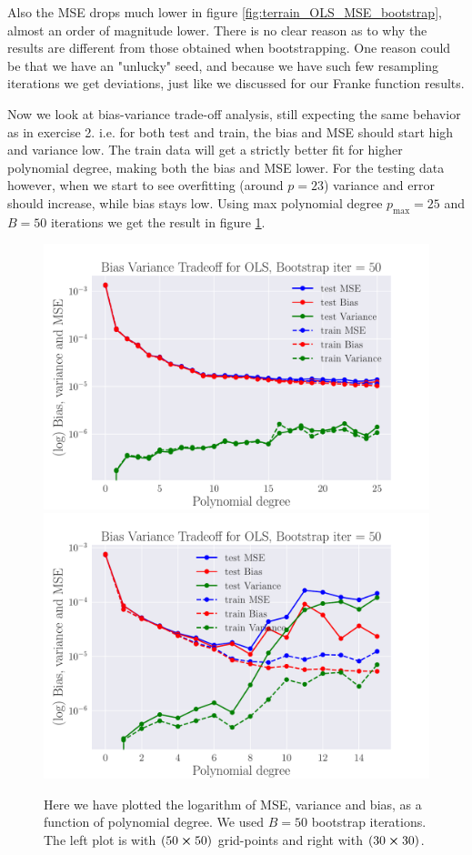\documentclass[reprint,english,notitlepage,aps,nobalancelastpage,nofootinbib]{revtex4-1}  %
\begin{document}
Also the MSE drops much lower in figure \ref{fig:terrain_OLS_MSE_bootstrap}, almost an order of magnitude lower. There is no clear reason as to why the results are different from those obtained when bootstrapping. One reason could be that we have an "unlucky" seed, and because we have such few resampling iterations we get deviations, just like we discussed for our Franke function results.

Now we look at bias-variance trade-off analysis, still expecting the same behavior as in exercise 2. i.e. for both test and train, the bias and MSE should start high and variance low. The train data will get a strictly better fit for higher polynomial degree, making both the bias and MSE lower. For the testing data however, when we start to see overfitting (around $p=23$) variance and error should increase, while bias stays low. Using max polynomial degree $p_\text{max}=25$ and $B=50$ iterations we get the result in figure \ref{fig:terrain_OLS_BVT}.

\begin{figure}[h]
	\includegraphics[width=\linewidth]{SRTM_BVT_OLS_n50_log.pdf}
	\endminipage\hfill
	\includegraphics[width=\linewidth]{SRTM_BVT_OLS_n30_log.pdf}
	\endminipage
	\caption{Here we have plotted the logarithm of MSE, variance and bias, as a function of polynomial degree. We used $B=50$ bootstrap iterations. The left plot is with $(50\cross50)$ grid-points and right with $(30\cross30)$.}
  \label{fig:terrain_OLS_BVT}
\end{figure}
\end{document}
